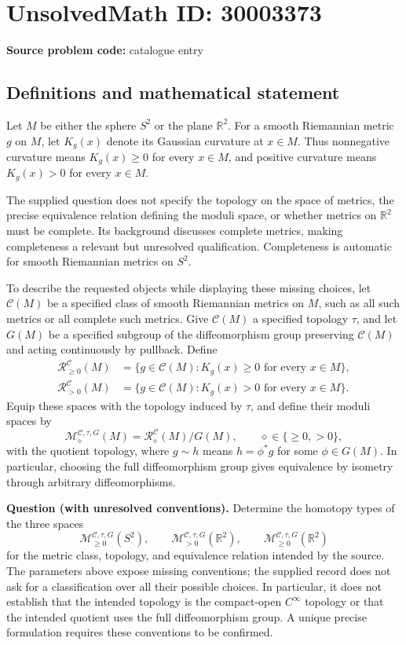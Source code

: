 \documentclass[11pt]{article}
\newcommand{\R}{\mathbb{R}}
\begin{document}
\section*{UnsolvedMath ID: 30003373}
\textbf{Source problem code:} catalogue entry
\subsection{Definitions and mathematical statement}
Let \(M\) be either the sphere \(S^2\) or the plane \(\R^2\). For a smooth Riemannian metric \(g\) on \(M\), let \(K_g(x)\) denote its Gaussian curvature at \(x\in M\). Thus nonnegative curvature means \(K_g(x)\geq 0\) for every \(x\in M\), and positive curvature means \(K_g(x)>0\) for every \(x\in M\).

The supplied question does not specify the topology on the space of metrics, the precise equivalence relation defining the moduli space, or whether metrics on \(\R^2\) must be complete. Its background discusses complete metrics, making completeness a relevant but unresolved qualification. Completeness is automatic for smooth Riemannian metrics on \(S^2\).

To describe the requested objects while displaying these missing choices, let \(\mathcal C(M)\) be a specified class of smooth Riemannian metrics on \(M\), such as all such metrics or all complete such metrics. Give \(\mathcal C(M)\) a specified topology \(\tau\), and let \(G(M)\) be a specified subgroup of the diffeomorphism group preserving \(\mathcal C(M)\) and acting continuously by pullback. Define
\[
\begin{aligned}
\mathcal R_{\geq 0}^{\mathcal C}(M)
 &=\{g\in\mathcal C(M):K_g(x)\geq 0\text{ for every }x\in M\},\\
\mathcal R_{>0}^{\mathcal C}(M)
 &=\{g\in\mathcal C(M):K_g(x)>0\text{ for every }x\in M\}.
\end{aligned}
\]
Equip these spaces with the topology induced by \(\tau\), and define their moduli spaces by
\[
\mathcal M_{\diamond}^{\mathcal C,\tau,G}(M)
 =\mathcal R_{\diamond}^{\mathcal C}(M)/G(M),
 \qquad \diamond\in\{\geq 0,>0\},
\]
with the quotient topology, where \(g\sim h\) means \(h=\phi^*g\) for some \(\phi\in G(M)\). In particular, choosing the full diffeomorphism group gives equivalence by isometry through arbitrary diffeomorphisms.

\textbf{Question (with unresolved conventions).} Determine the homotopy types of the three spaces
\[
\mathcal M_{\geq 0}^{\mathcal C,\tau,G}(S^2),\qquad
\mathcal M_{>0}^{\mathcal C,\tau,G}(\R^2),\qquad
\mathcal M_{\geq 0}^{\mathcal C,\tau,G}(\R^2)
\]
for the metric class, topology, and equivalence relation intended by the source. The parameters above expose missing conventions; the supplied record does not ask for a classification over all their possible choices. In particular, it does not establish that the intended topology is the compact-open \(C^\infty\) topology or that the intended quotient uses the full diffeomorphism group. A unique precise formulation requires these conventions to be confirmed.
\end{document}
